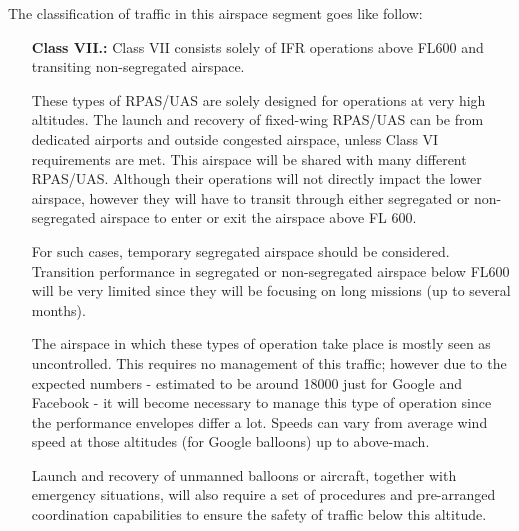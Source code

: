 \noindent The classification of traffic in this airspace segment goes like follow:

\begin{itemize}
    \item[\textbf{Class VII.:}]Class VII consists solely of IFR operations above FL600 and transiting non-segregated airspace.
    
    These types of RPAS/UAS are solely designed for operations at very high altitudes. The launch and recovery of fixed-wing RPAS/UAS can be from dedicated airports and outside congested airspace, unless Class VI requirements are met. This airspace will be shared with many different RPAS/UAS. Although their operations will not directly impact the lower airspace, however they will have to transit through either segregated or non-segregated airspace to enter or exit the airspace above FL 600.
    
    For such cases, temporary segregated airspace should be considered. Transition performance in segregated or non-segregated airspace below FL600 will be very limited since they will be focusing on long missions (up to several months).

    The airspace in which these types of operation take place is mostly seen as uncontrolled. This requires no management of this traffic; however due to the expected numbers - estimated to be around 18000 just for Google and Facebook - it will become necessary to manage this type of operation since the performance envelopes differ a lot. Speeds can vary from average wind speed at those altitudes (for Google balloons) up to above-mach.

    Launch and recovery of unmanned balloons or aircraft, together with emergency situations, will also require a set of procedures and pre-arranged coordination capabilities to ensure the safety of traffic below this altitude.
\end{itemize}


